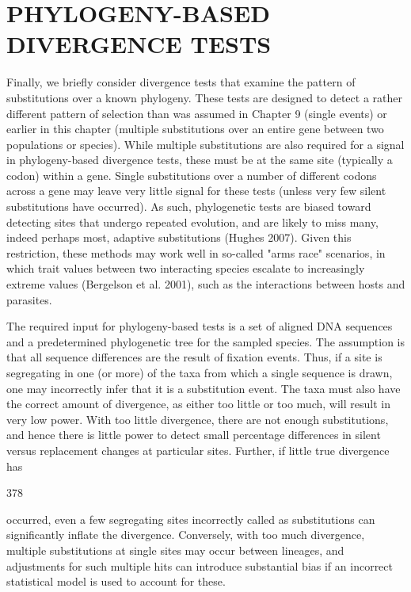 \documentclass{article}
\begin{document}
\section{PHYLOGENY-BASED DIVERGENCE TESTS}
Finally, we briefly consider divergence tests that examine the pattern of substitutions over a known phylogeny. These tests are designed to detect a rather different pattern of selection than was assumed in Chapter 9 (single events) or earlier in this chapter (multiple substitutions over an entire gene between two populations or species). While multiple substitutions are also required for a signal in phylogeny-based divergence tests, these must be at the same site (typically a codon) within a gene. Single substitutions over a number of different codons across a gene may leave very little signal for these tests (unless very few silent substitutions have occurred). As such, phylogenetic tests are biased toward detecting sites that undergo repeated evolution, and are likely to miss many, indeed perhaps most, adaptive substitutions (Hughes 2007). Given this restriction, these methods may work well in so-called "arms race" scenarios, in which trait values between two interacting species escalate to increasingly extreme values (Bergelson et al. 2001), such as the interactions between hosts and parasites.

The required input for phylogeny-based tests is a set of aligned DNA sequences and a predetermined phylogenetic tree for the sampled species. The assumption is that all sequence differences are the result of fixation events. Thus, if a site is segregating in one (or more) of the taxa from which a single sequence is drawn, one may incorrectly infer that it is a substitution event. The taxa must also have the correct amount of divergence, as either too little or too much, will result in very low power. With too little divergence, there are not enough substitutions, and hence there is little power to detect small percentage differences in silent versus replacement changes at particular sites. Further, if little true divergence has

378

occurred, even a few segregating sites incorrectly called as substitutions can significantly inflate the divergence. Conversely, with too much divergence, multiple substitutions at single sites may occur between lineages, and adjustments for such multiple hits can introduce substantial bias if an incorrect statistical model is used to account for these.
\end{document}
